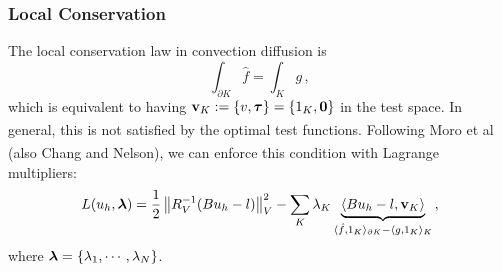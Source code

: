 \documentclass{beamer}
\begin{document}
\begin{frame}
\frametitle{Local Conservation}
The local conservation law in convection diffusion is
\[
\int_{\partial K}\hat f=\int_K g\,,
\]
which is equivalent to having $\mathbf{v}_K:=\{v,\boldsymbol\tau\}=\{1_K,\boldsymbol0\}$ in the test space.
In general, this is not satisfied by the optimal test functions.
Following Moro et al\textsuperscript{\cite{MoroNguyenPeraire11}} (also
Chang and Nelson\textsuperscript{\cite{ChangNelson1997}}), we
can enforce this condition with Lagrange multipliers:
\begin{align*}
L(u_h,\boldsymbol\lambda) = \frac{1}{2}\left\| R_V^{-1}(Bu_h-l) \right\|_V^2
-\sum_K\lambda_K\underbrace{\langle Bu_h-l,\mathbf{v}_K\rangle}_
{\langle\hat f, 1_K\rangle_{\partial K}-\langle g,1_K\rangle_K}\,,
\end{align*}
where $\boldsymbol\lambda=\{\lambda_1,\cdots,\lambda_N\}$.
\end{frame}

\end{document}
